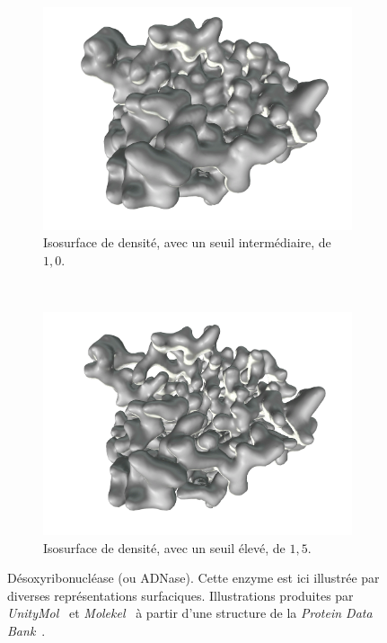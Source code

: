 \begin{figure}[H]
\begin{subfigure}[t]{\subImgW}
			\includegraphics[width=\textwidth]{./figures/ch1/4awn_iso_1_0}
			\caption{Isosurface de densité, avec un seuil intermédiaire, de $1,0$.}
			\label{fig:4awn_iso_1_0}
		\end{subfigure}
		~
		\begin{subfigure}[t]{\subImgW}
			\centering
			\includegraphics[width=\textwidth]{./figures/ch1/4awn_iso_1_5}
			\caption{Isosurface de densité, avec un seuil élevé, de $1,5$.}
			\label{fig:4awn_iso_1_5}
		\end{subfigure}
		\caption{Désoxyribonucléase (ou ADNase). Cette enzyme est ici illustrée par diverses représentations surfaciques. Illustrations produites par \emph{UnityMol}~\cite{doutreligne2014unitymol} et \emph{Molekel}~\cite{portmann2000molekel, varetto2009molekel} à partir d'une structure de la \emph{Protein Data Bank}~\cite{parsiegla2012structure}.}
		\label{fig:4awn_surf}
	\end{figure}
    
